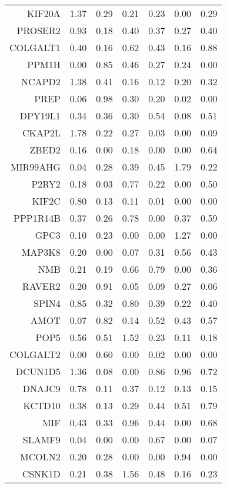 \begin{longtable}{rrrrrrr}
  KIF20A & 1.37 & 0.29 & 0.21 & 0.23 & 0.00 & 0.29 \\ 
  PROSER2 & 0.93 & 0.18 & 0.40 & 0.37 & 0.27 & 0.40 \\ 
  COLGALT1 & 0.40 & 0.16 & 0.62 & 0.43 & 0.16 & 0.88 \\ 
  PPM1H & 0.00 & 0.85 & 0.46 & 0.27 & 0.24 & 0.00 \\ 
  NCAPD2 & 1.38 & 0.41 & 0.16 & 0.12 & 0.20 & 0.32 \\ 
  PREP & 0.06 & 0.98 & 0.30 & 0.20 & 0.02 & 0.00 \\ 
  DPY19L1 & 0.34 & 0.36 & 0.30 & 0.54 & 0.08 & 0.51 \\ 
  CKAP2L & 1.78 & 0.22 & 0.27 & 0.03 & 0.00 & 0.09 \\ 
  ZBED2 & 0.16 & 0.00 & 0.18 & 0.00 & 0.00 & 0.64 \\ 
  MIR99AHG & 0.04 & 0.28 & 0.39 & 0.45 & 1.79 & 0.22 \\ 
  P2RY2 & 0.18 & 0.03 & 0.77 & 0.22 & 0.00 & 0.50 \\ 
  KIF2C & 0.80 & 0.13 & 0.11 & 0.01 & 0.00 & 0.00 \\ 
  PPP1R14B & 0.37 & 0.26 & 0.78 & 0.00 & 0.37 & 0.59 \\ 
  GPC3 & 0.10 & 0.23 & 0.00 & 0.00 & 1.27 & 0.00 \\ 
  MAP3K8 & 0.20 & 0.00 & 0.07 & 0.31 & 0.56 & 0.43 \\ 
  NMB & 0.21 & 0.19 & 0.66 & 0.79 & 0.00 & 0.36 \\ 
  RAVER2 & 0.20 & 0.91 & 0.05 & 0.09 & 0.27 & 0.06 \\ 
  SPIN4 & 0.85 & 0.32 & 0.80 & 0.39 & 0.22 & 0.40 \\ 
  AMOT & 0.07 & 0.82 & 0.14 & 0.52 & 0.43 & 0.57 \\ 
  POP5 & 0.56 & 0.51 & 1.52 & 0.23 & 0.11 & 0.18 \\ 
  COLGALT2 & 0.00 & 0.60 & 0.00 & 0.02 & 0.00 & 0.00 \\ 
  DCUN1D5 & 1.36 & 0.08 & 0.00 & 0.86 & 0.96 & 0.72 \\ 
  DNAJC9 & 0.78 & 0.11 & 0.37 & 0.12 & 0.13 & 0.15 \\ 
  KCTD10 & 0.38 & 0.13 & 0.29 & 0.44 & 0.51 & 0.79 \\ 
  MIF & 0.43 & 0.33 & 0.96 & 0.44 & 0.00 & 0.68 \\ 
  SLAMF9 & 0.04 & 0.00 & 0.00 & 0.67 & 0.00 & 0.07 \\ 
  MCOLN2 & 0.20 & 0.28 & 0.00 & 0.00 & 0.94 & 0.00 \\ 
  CSNK1D & 0.21 & 0.38 & 1.56 & 0.48 & 0.16 & 0.23 \\ 

\end{longtable}

